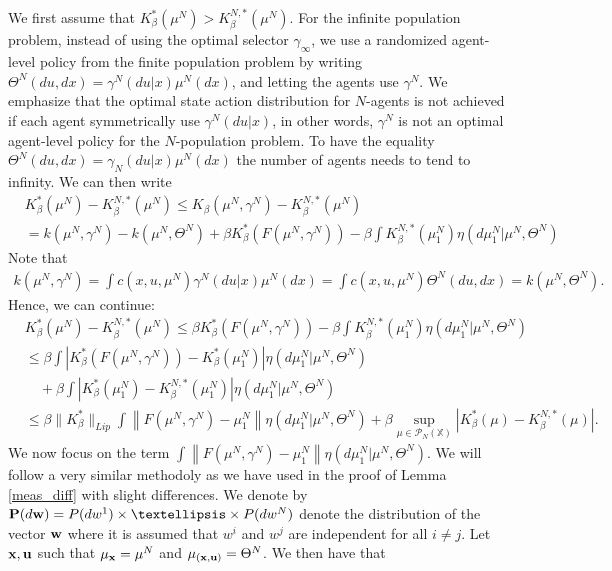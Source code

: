 \documentclass[twoside,11pt]{article}
\def\P{{\mathcal P}}
\begin{document}
We first  assume that $K_\beta^*(\mu^N) > K_\beta^{N,*}(\mu^N)$. For the infinite population problem, instead of using the optimal selector $\gamma_\infty$, we use a randomized agent-level policy from the finite population problem by writing $\Theta^N(du,dx)=\gamma^N(du|x)\mu^N(dx)$, and letting the agents use $\gamma^N$. We emphasize that the optimal state action distribution for  $N$-agents is not achieved if each agent symmetrically use $\gamma^N(du|x)$, in other words, $\gamma^N$ is not an optimal agent-level policy for the $N$-population problem.  To have the equality $\Theta^N(du,dx)=\gamma_N(du|x)\mu^N(dx)$ the number of agents needs to tend to infinity. We can then write
\begin{align*}
& K_\beta^{*}(\mu^N) - K_\beta^{N,*}(\mu^N)\leq  K_\beta(\mu^N,\gamma^N) - K_\beta^{N,*}(\mu^N)\\
&= k(\mu^N,\gamma^N) - k(\mu^N,\Theta^N) + \beta K_\beta^*\left(F(\mu^N,\gamma^N)\right) - \beta \int K_\beta^{N,*}(\mu_1^N)\eta(d\mu_1^N|\mu^N,\Theta^N)
\end{align*}
Note that
\begin{align*}
 k(\mu^N,\gamma^N)  = \int c(x,u,\mu^N)\gamma^N(du|x)\mu^N(dx) = \int c(x,u,\mu^N)\Theta^N(du,dx) = k(\mu^N,\Theta^N).
\end{align*}
 Hence, we can continue:
\begin{align}\label{bound_inf_big}
& K_\beta^{*}(\mu^N) - K_\beta^{N,*}(\mu^N) \leq \beta K_\beta^*\left(F(\mu^N,\gamma^N)\right) - \beta \int K_\beta^{N,*}(\mu_1^N)\eta(d\mu_1^N|\mu^N,\Theta^N)\nonumber\\
& \leq  \beta \int \left| K_\beta^*\left(F(\mu^N,\gamma^N)\right) - K_\beta^*(\mu_1^N)\right| \eta(d\mu_1^N|\mu^N,\Theta^N)\nonumber\\
&\quad + \beta \int \left|  K_\beta^*(\mu_1^N) - K_\beta^{N,*}(\mu_1^N)\right| \eta(d\mu_1^N|\mu^N,\Theta^N)\nonumber\\
& \leq \beta \|K_\beta^*\|_{Lip} \int \left\| F(\mu^N,\gamma^N) - \mu_1^N\right\| \eta(d\mu_1^N|\mu^N,\Theta^N) + \beta \sup_{\mu\in \P_N(\mathds{X})} \left| K_\beta^*(\mu)-  K_\beta^{N,*}(\mu)\right|.
\end{align}
We now focus on the term $ \int \left\| F(\mu^N,\gamma^N) - \mu_1^N\right\| \eta(d\mu_1^N|\mu^N,\Theta^N) $.  We will follow a very similar methodoly as we have used in the proof of Lemma \ref{meas_diff} with slight differences. We denote by ${\bf P}(d{\bf w}) = P(dw^1) \times \dots \times P(dw^N)$ denote the distribution of the vector ${\bf w}$ where it is assumed that $w^i$ and $w^j$ are independent for all $i\neq j$.  Let ${\bf x,u}$ such that $\mu_{\bf x}=\mu^N$ and $\mu_{\bf (x,u)}=\Theta^N$.  We then have that 
\end{document}
